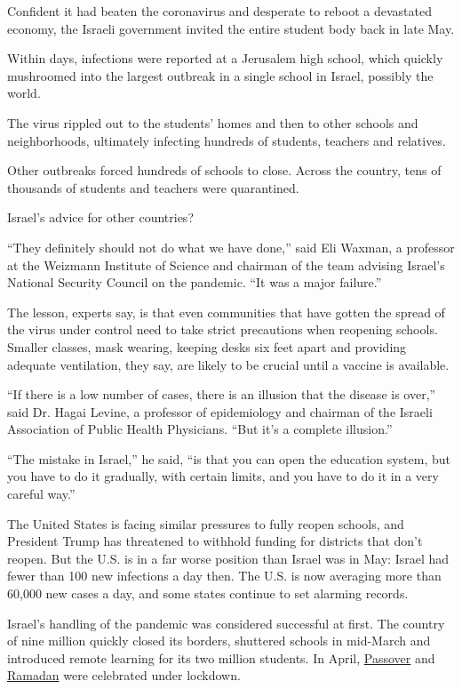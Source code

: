 Confident it had beaten the coronavirus and desperate to reboot a
devastated economy, the Israeli government invited the entire student
body back in late May.

Within days, infections were reported at a Jerusalem high school, which
quickly mushroomed into the largest outbreak in a single school in
Israel, possibly the world.

The virus rippled out to the students' homes and then to other schools
and neighborhoods, ultimately infecting hundreds of students, teachers
and relatives.

Other outbreaks forced hundreds of schools to close. Across the country,
tens of thousands of students and teachers were quarantined.

Israel's advice for other countries?

``They definitely should not do what we have done,'' said Eli Waxman, a
professor at the Weizmann Institute of Science and chairman of the team
advising Israel's National Security Council on the pandemic. ``It was a
major failure.''

The lesson, experts say, is that even communities that have gotten the
spread of the virus under control need to take strict precautions when
reopening schools. Smaller classes, mask wearing, keeping desks six feet
apart and providing adequate ventilation, they say, are likely to be
crucial until a vaccine is available.

``If there is a low number of cases, there is an illusion that the
disease is over,'' said Dr. Hagai Levine, a professor of epidemiology
and chairman of the Israeli Association of Public Health Physicians.
``But it's a complete illusion.''

``The mistake in Israel,'' he said, ``is that you can open the education
system, but you have to do it gradually, with certain limits, and you
have to do it in a very careful way.''

The United States is facing similar pressures to fully reopen schools,
and President Trump has threatened to withhold funding for districts
that don't reopen. But the U.S. is in a far worse position than Israel
was in May: Israel had fewer than 100 new infections a day then. The
U.S. is now averaging more than 60,000 new cases a day, and some states
continue to set alarming records.

Israel's handling of the pandemic was considered successful at first.
The country of nine million quickly closed its borders, shuttered
schools in mid-March and introduced remote learning for its two million
students. In April,
\href{https://www.nytimes3xbfgragh.onion/2020/04/07/world/middleeast/coronavirus-passover-israel.html?searchResultPosition=1}{Passover}
and
\href{https://www.nytimes3xbfgragh.onion/2020/05/15/world/middleeast/ramadan-coronavirus-al-aqsa.html?searchResultPosition=1}{Ramadan}
were celebrated under lockdown.

